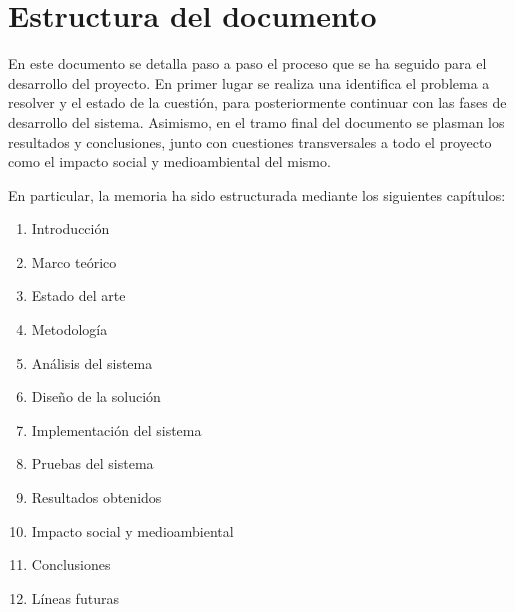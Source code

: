 \section{Estructura del documento}

    En este documento se detalla paso a paso el proceso que se ha seguido para el desarrollo del proyecto. En primer lugar se realiza una identifica el problema a resolver y el estado de la cuestión, para posteriormente continuar con las fases de desarrollo del sistema. Asimismo, en el tramo final del documento se plasman los resultados y conclusiones, junto con cuestiones transversales a todo el proyecto como el impacto social y medioambiental del mismo.
    
    
    En particular, la memoria ha sido estructurada mediante los siguientes capítulos:
    \begin{enumerate}
        \item Introducción
        \item Marco teórico
        \item Estado del arte
        \item Metodología 
        \item Análisis del sistema
        \item Diseño de la solución
        \item Implementación del sistema
        \item Pruebas del sistema
        \item Resultados obtenidos
        \item Impacto social y medioambiental
        \item Conclusiones
        \item Líneas futuras
    \end{enumerate}